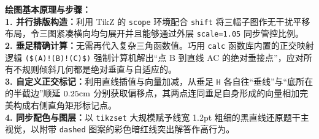 \vspace{0.6cm}

{\small\color{blue!70!black}
\textbf{绘图基本原理与步骤：}\\
\textbf{1. 并行排版构造：}利用 TikZ 的 \texttt{scope} 环境配合 \texttt{shift} 将三幅子图作无干扰平移布局，令三图紧凑横向均匀展开并且能够通过外层 \texttt{scale=1.05} 同步管控比例。\\
\textbf{2. 垂足精确计算：}无需再代入复杂三角函数值。巧用 \texttt{calc} 函数库内置的正交映射逻辑 \texttt{(\$(A)!(B)!(C)\$)} 强制计算机解出“点 B 到直线 AC 的绝对垂接点”，应对所有不规则倾斜几何都是绝对垂直与自适应的。\\
\textbf{3. 自定义正交标记：}利用直线插值与向量加减，从垂足 \texttt{H} 各自往“垂线”与“底所在的半截边”顺延 $0.25\rm{cm}$ 分别获取偏移点，其两点连同垂足自身形成的向量相加完美构成右侧直角矩形标记点。\\
\textbf{4. 同步配色与图层：}以 \texttt{tikzset} 大规模赋予线宽 1.2pt 粗细的黑直线还原题干主视觉，以附带 \texttt{dashed} 图案的彩色暗红线突出解答作高行为。
}

